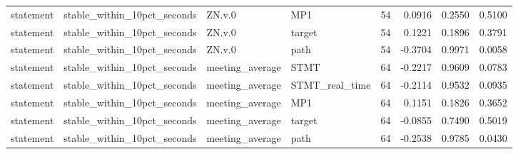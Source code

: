 \begin{tabular}{llllrrrr}
statement & stable_within_10pct_seconds & ZN.v.0 & MP1 & 54 & 0.0916 & 0.2550 & 0.5100 \\
statement & stable_within_10pct_seconds & ZN.v.0 & target & 54 & 0.1221 & 0.1896 & 0.3791 \\
statement & stable_within_10pct_seconds & ZN.v.0 & path & 54 & -0.3704 & 0.9971 & 0.0058 \\
statement & stable_within_10pct_seconds & meeting_average & STMT & 64 & -0.2217 & 0.9609 & 0.0783 \\
statement & stable_within_10pct_seconds & meeting_average & STMT_real_time & 64 & -0.2114 & 0.9532 & 0.0935 \\
statement & stable_within_10pct_seconds & meeting_average & MP1 & 64 & 0.1151 & 0.1826 & 0.3652 \\
statement & stable_within_10pct_seconds & meeting_average & target & 64 & -0.0855 & 0.7490 & 0.5019 \\
statement & stable_within_10pct_seconds & meeting_average & path & 64 & -0.2538 & 0.9785 & 0.0430 \\
\bottomrule
\end{tabular}
